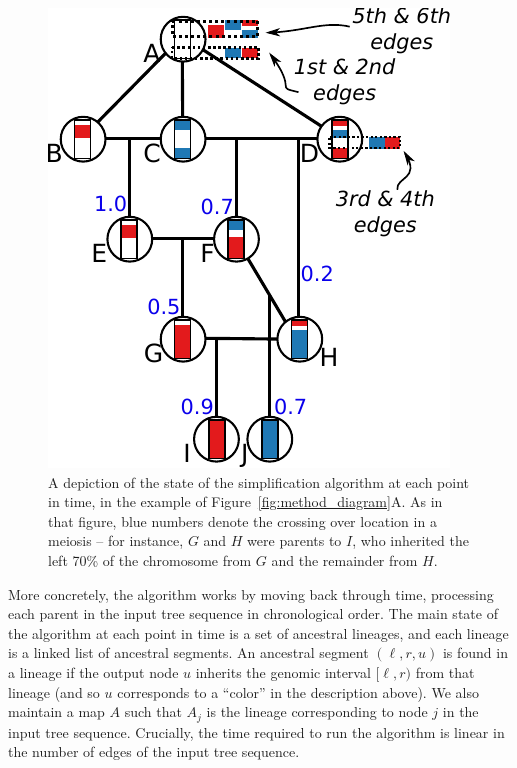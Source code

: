 \documentclass{article}
\begin{document}
\begin{figure}
    \begin{center}
        \includegraphics{simplify-state-diagram}
    \end{center}
    \caption{
        A depiction of the state of the simplification algorithm
        at each point in time,
        in the example of Figure~\ref{fig:method_diagram}A.
        As in that figure, blue numbers denote the crossing over location in a meiosis --
        for instance, $G$ and $H$ were parents to $I$,
        who inherited the left 70\% of the chromosome from $G$ and the remainder from $H$.
        \label{fig:simplify_state}
    }
\end{figure}

More concretely,
the algorithm works by moving back through time,
processing each parent in the input tree sequence in chronological order.
The main state of the algorithm at each point in time is a set of ancestral lineages,
and each lineage is a linked list of ancestral segments.
An ancestral segment $(\ell, r, u)$ is found in a lineage
if the output node $u$ inherits the genomic interval $[\ell, r)$ from that lineage
(and so $u$ corresponds to a ``color'' in the description above).
We also maintain a map $A$ such that $A_j$ is the lineage
corresponding to node $j$ in the input tree sequence.
Crucially, the time required to run the algorithm is
linear in the number of edges of the input tree sequence.
\end{document}
